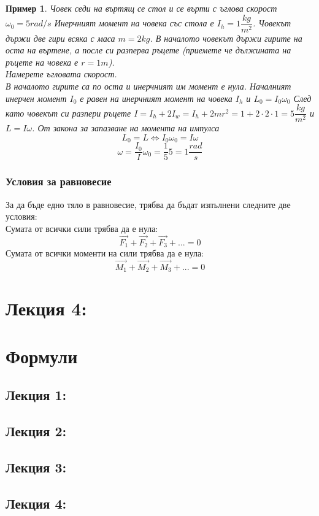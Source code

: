 \documentclass[fleqn, 12pt]{article}
\newtheorem{example}{Пример}[subsection]
\begin{document}
\begin{example}
Човек седи на въртящ се стол и се върти с ъглова скорост $ \omega_0 = 5 rad/s $ Инерчният момент на човека със стола е $I_h = 1 \dfrac{kg}{m^2}$. Човекът държи две гири всяка с маса $m = 2 kg$. В началото човекът държи гирите на оста на въртене, а после си разперва ръцете (приемете че дължината на ръцете на човека е $r = 1 m$).\\
Намерете ъгловата скорост.\\
В началото гирите са по оста и инерчният им момент е нула. Началният инерчен момент $I_0$ е равен на инерчният момент на човека $I_h$ и $L_0 = I_0 \omega_0$ След като човекът си разпери ръцете $I = I_h + 2I_w = I_h + 2mr^2 = 1 + 2 \cdot 2 \cdot 1 = 5 \dfrac{kg}{m^2}$ и $L = I \omega$. От закона за запазване на момента на импулса
$$L_0 = L \Leftrightarrow I_0 \omega_0 = I\omega$$
$$\omega = \dfrac{I_0}{I} \omega_0 = \dfrac{1}{5} 5 = 1 \dfrac{rad}{s}$$
\end{example}

\subsubsection{Условия за равновесие}
За да бъде едно тяло в равновесие, трябва да бъдат изпълнени следните две условия: \\
Сумата от всички сили трябва да е нула:
$$\vec{F_1} + \vec{F_2} + \vec{F_3} + ... = 0$$
Сумата от всички моменти на сили трябва да е нула:
$$\vec{M_1} + \vec{M_2} + \vec{M_3} + ... = 0$$

\newpage
\section{Лекция 4: }

\newpage
\section{Формули}

\subsection{Лекция 1:}

\subsection{Лекция 2:}

\subsection{Лекция 3: }

\subsection{Лекция 4: }
\end{document}
